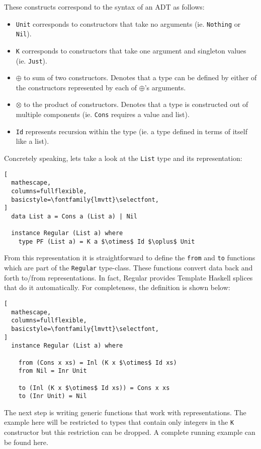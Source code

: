 \documentclass[8pt]{extarticle}
\begin{document}
These constructs correspond to the syntax of an ADT as follows:
\begin{itemize}
\item \verb+Unit+ corresponds to constructors that take no arguments (ie. \verb+Nothing+ or \verb+Nil+).
\item \verb+K+ corresponds to constructors that take one argument and singleton values (ie. \verb+Just+).
\item $\oplus$ to sum of two constructors. Denotes that a type can be defined by either of the constructors represented by each of $\oplus$'s arguments.
\item $\otimes$ to the product of constructors. Denotes that a type is constructed out of multiple components (ie. \verb+Cons+ requires a value and list).
\item \verb+Id+ represents recursion within the type (ie. a type defined in terms of itself like a list).
\end{itemize}
Concretely speaking, lets take a look at the \verb+List+ type and its representation:
\begin{lstlisting}[
  mathescape,
  columns=fullflexible,
  basicstyle=\fontfamily{lmvtt}\selectfont,
]
  data List a = Cons a (List a) | Nil

  instance Regular (List a) where
    type PF (List a) = K a $\otimes$ Id $\oplus$ Unit
\end{lstlisting}
From this representation it is straightforward to define the \verb+from+ and \verb+to+ functions which are part of the \verb+Regular+ type-class. These functions convert data back and forth to/from representations. In fact, Regular provides Template Haskell splices that do it automatically. For completeness, the definition is shown below:
\begin{lstlisting}[
  mathescape,
  columns=fullflexible,
  basicstyle=\fontfamily{lmvtt}\selectfont,
]
  instance Regular (List a) where

    from (Cons x xs) = Inl (K x $\otimes$ Id xs)
    from Nil = Inr Unit
    
    to (Inl (K x $\otimes$ Id xs)) = Cons x xs
    to (Inr Unit) = Nil
\end{lstlisting}
The next step is writing generic functions that work with representations. The example here will be restricted to types that contain only integers in the \verb+K+ constructor but this restriction can be dropped. A complete running example can be found here\cite{RegularDemo}.
\\\\
\end{document}
